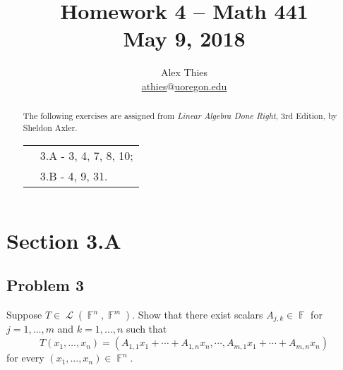 \documentclass[letterpaper, 12pt]{amsart}
\DeclareMathOperator{\F}{\mathbb{F}}				%
\DeclareMathOperator{\Ell}{\mathscr{L}}				%
\theoremstyle{definition}  							%
\begin{document}
	\title{Homework 4  -- Math 441 \\ M\lowercase{ay 9, 2018}}
	\author{Alex Thies \\ \href{mailto:athies@uoregon.edu}{\lowercase{athies$@$uoregon.edu}}}

	\begin{abstract}
	The following exercises are assigned from \textit{Linear Algebra Done Right}, 3rd Edition, by Sheldon Axler. 
			\begin{tabular}{rl}
				& 3.A - 3, 4, 7, 8, 10; \\
				& 3.B - 4, 9, 31.
			\end{tabular}
	\end{abstract}
	
	\maketitle

	\section*{Section 3.A}
		\subsection*{Problem 3}
		Suppose $T \in \Ell (\F^{n}, \F^{m})$.
		Show that there exist scalars $A_{j,k} \in \F$ for $j = 1, \dots, m$ and $k = 1, \dots, n$ such that $$T(x_{1}, \dots, x_{n}) = (A_{1,1} x_{1} + \cdots + A_{1,n}x_{n}, \cdots, A_{m,1}x_{1} + \cdots + A_{m,n}x_{n})$$ for every $(x_{1}, \dots, x_{n}) \in \F^{n}$.
\end{document}
